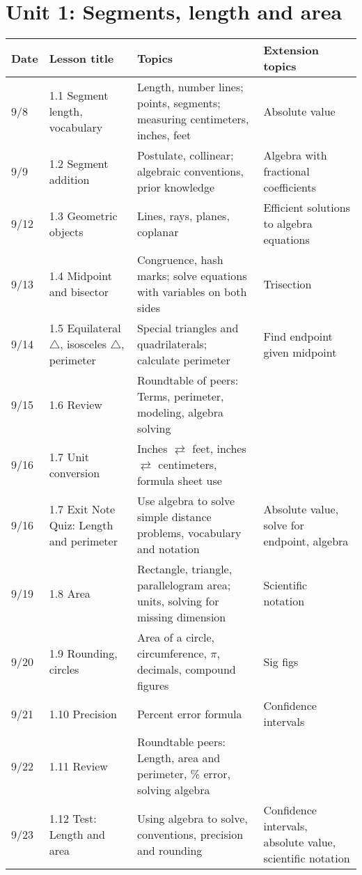 

\geometry{hoffset=-0.5in, textwidth=7.5in}

\fancyhead[RE]{\thepage}
\fancyhead[RO]{\thepage }%



\section*{Unit 1: Segments, length and area}
\begin{tabular}{|p{0.9cm}|p{4cm}|p{7cm}|p{5cm}|}
  \hline
  Date & Lesson title & Topics  & Extension topics \\
  \hline
  9/8 & 1.1 Segment length, vocabulary & Length, number lines; points, segments; measuring centimeters, inches, feet & Absolute value \\
  \hline
  9/9 & 1.2 Segment addition & Postulate, collinear; algebraic conventions, prior knowledge & Algebra with fractional coefficients \\
  \hline
  9/12 & 1.3 Geometric objects & Lines, rays, planes, coplanar & Efficient solutions to algebra equations \\
  \hline
  9/13 & 1.4 Midpoint and bisector & Congruence, hash marks; solve equations with variables on both sides & Trisection \\
  \hline
  9/14 & 1.5 Equilateral $\triangle$, isosceles $\triangle$, perimeter & Special triangles and quadrilaterals; calculate perimeter & Find endpoint given midpoint \\
  \hline
  9/15 & 1.6 Review & Roundtable of peers: Terms, perimeter, modeling, algebra solving & \\
  \hline
  9/16 & 1.7 Unit conversion & Inches $\rightleftarrows$ feet, inches $\rightleftarrows$ centimeters, formula sheet use & \\
  \hline
  9/16 & 1.7 Exit Note Quiz: Length and perimeter & Use algebra to solve simple distance problems, vocabulary and notation & Absolute value, solve for endpoint, algebra \\
  \hline
  9/19 & 1.8 Area & Rectangle, triangle, parallelogram area; units, solving for missing dimension & Scientific notation \\
  \hline
  9/20 & 1.9 Rounding, circles & Area of a circle, circumference, $\pi$, decimals, compound figures & Sig figs \\
  \hline
  9/21 & 1.10 Precision & Percent error formula & Confidence intervals \\
  \hline
  9/22 & 1.11 Review & Roundtable peers: Length, area and perimeter, \% error, solving algebra & \\
  \hline
  9/23 & 1.12 Test: Length and area & Using algebra to solve, conventions, precision and rounding & Confidence intervals, absolute value, scientific notation \\
  \hline

\end{tabular} \par \vspace*{0.3cm}
